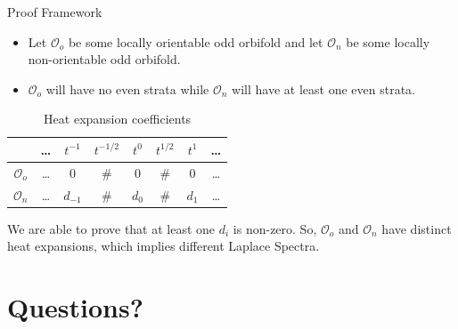 \documentclass[12pt]{beamer}
\begin{document}
\begin{frame}{Proof Framework}
    \begin{itemize}
        \item Let $\mathcal{O}_o$ be some locally orientable odd orbifold and
            let $\mathcal{O}_n$ be some locally non-orientable odd orbifold.
        \item $\mathcal{O}_o$ will have no even strata while
            $\mathcal{O}_n$ will have at least one even strata.
    \end{itemize}
\begin{center}
    \begin{table}
\begin{tabular}{c | c c c c c c c}
    & \dots & $t^{-1}$ & $t^{-1/2}$ & $t^{0}$ & $t^{1/2}$ & $t^{1}$ & \dots\\
\hline
$\mathcal{O}_o$ &
    \dots & $0$ & $\#$ & $0$ & $\# $& $0$ & \dots \\
$\mathcal{O}_n$ &
\dots & $d_{-1}$ & $\#$ & $d_0$ & $\# $& $d_1$ & \dots  \\
\end{tabular}
\caption{Heat expansion coefficients}
\end{table}
\end{center}

We are able to prove that at least one $d_i$ is non-zero. So,
$\mathcal{O}_o$ and $\mathcal{O}_n$ have distinct heat expansions, which
implies different Laplace Spectra.

\end{frame}

\section{Questions?}
\end{document}
